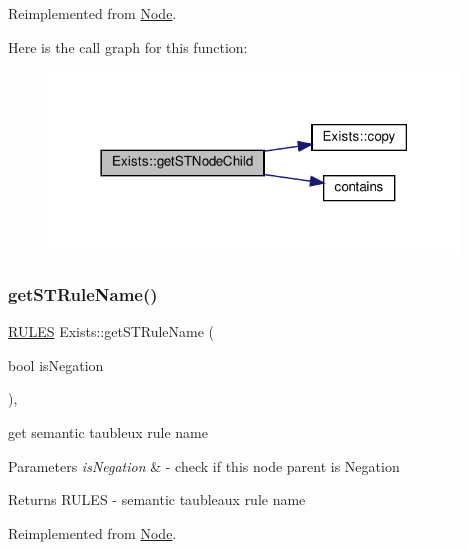 Reimplemented from \hyperlink{class_node_a1009cb6d84206c2b5eaa86580da59a7c}{Node}.

Here is the call graph for this function\+:\nopagebreak
\begin{figure}[H]
\begin{center}
\leavevmode
\includegraphics[width=309pt]{de/d16/class_exists_ad60177b343503d1ee8bdda801c2d32d6_cgraph}
\end{center}
\end{figure}
\mbox{\label{class_exists_aff7b8694345884d06bdd751e88fae041}} 
\subsubsection{\texorpdfstring{get\+S\+T\+Rule\+Name()}{getSTRuleName()}}
{\footnotesize\ttfamily \hyperlink{proposition_2tableaux_2enum_8h_a70c93904c6a27d228050f922eb4fc3b8}{R\+U\+L\+ES} Exists\+::get\+S\+T\+Rule\+Name (\begin{DoxyParamCaption}\item[{bool}]{is\+Negation }\end{DoxyParamCaption})\hspace{0.3cm}{\ttfamily [override]}, {\ttfamily [virtual]}}



get semantic taubleux rule name 


\begin{DoxyParams}{Parameters}
{\em is\+Negation} & -\/ check if this node parent is Negation \\
\hline
\end{DoxyParams}
\begin{DoxyReturn}{Returns}
R\+U\+L\+ES -\/ semantic taubleaux rule name 
\end{DoxyReturn}


Reimplemented from \hyperlink{class_node_a25b6581950988c2536a392a6874c8072}{Node}.

